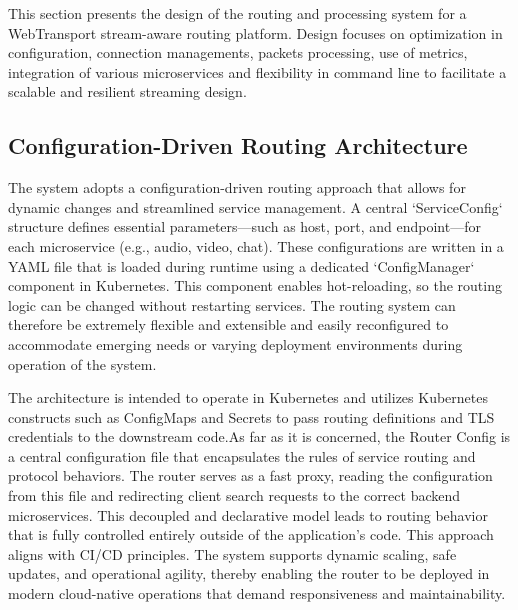 {This section presents the design of the routing and processing system for a WebTransport stream-aware routing platform. Design focuses on optimization in configuration, connection managements, packets processing, use of metrics, integration of various microservices and flexibility in command line to facilitate a scalable and resilient streaming design.

\subsection{Configuration-Driven Routing Architecture}



The system adopts a configuration-driven routing approach that allows for dynamic changes and streamlined service management. A central `ServiceConfig` structure defines essential parameters—such as host, port, and endpoint—for each microservice (e.g., audio, video, chat). These configurations are written in a YAML file that is loaded during runtime using a dedicated `ConfigManager` component in Kubernetes. This component enables hot-reloading, so the routing logic can be changed without restarting services. The routing system can therefore be extremely flexible and extensible and easily reconfigured to accommodate emerging needs or varying deployment environments during operation of the system.

The architecture is intended to operate in Kubernetes and utilizes Kubernetes constructs such as ConfigMaps and Secrets to pass routing definitions and TLS credentials to the downstream code.As far as it is concerned, the Router Config is a central configuration file that encapsulates the rules of service routing and protocol behaviors. The router serves as a fast proxy, reading the configuration from this file and redirecting client search requests to the correct backend microservices. This decoupled and declarative model leads to routing behavior that is fully controlled entirely outside of the application's code. This approach aligns with CI/CD principles. The system supports dynamic scaling, safe updates, and operational agility, thereby enabling the router to be deployed in modern cloud-native operations that demand responsiveness and maintainability.


\begin{figure}[h]
\centering
{}
\end{figure}}
